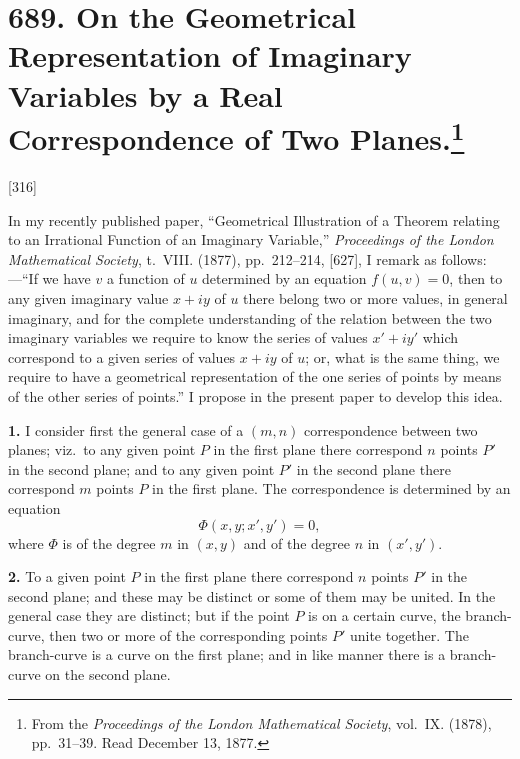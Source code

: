 \documentclass[11pt,a4paper]{book}
\begin{document}
\newpage
\section[On the Geometrical Representation of Imaginary Variables by a Real Correspondence of Two Planes]{689. On the Geometrical Representation of Imaginary Variables by a Real Correspondence of Two Planes.\footnote{From the \textit{Proceedings of the London Mathematical Society}, vol.\ IX. (1878), pp.\ 31--39. Read December 13, 1877.}}

[316]

In my recently published paper, ``Geometrical Illustration of a Theorem relating to an Irrational Function of an Imaginary Variable,'' \textit{Proceedings of the London Mathematical Society}, t.\ VIII. (1877), pp.\ 212--214, [627], I remark as follows:---``If we have $v$ a function of $u$ determined by an equation $f(u, v) = 0$, then to any given imaginary value $x + iy$ of $u$ there belong two or more values, in general imaginary, and for the complete understanding of the relation between the two imaginary variables we require to know the series of values $x' + iy'$ which correspond to a given series of values $x + iy$ of $u$; or, what is the same thing, we require to have a geometrical representation of the one series of points by means of the other series of points.'' I propose in the present paper to develop this idea.

\medskip
\noindent\textbf{1.}\quad
I consider first the general case of a $(m, n)$ correspondence between two planes; viz.\ to any given point $P$ in the first plane there correspond $n$ points $P'$ in the second plane; and to any given point $P'$ in the second plane there correspond $m$ points $P$ in the first plane. The correspondence is determined by an equation
\[
\Phi(x, y; x', y') = 0,
\]
where $\Phi$ is of the degree $m$ in $(x, y)$ and of the degree $n$ in $(x', y')$.

\medskip
\noindent\textbf{2.}\quad
To a given point $P$ in the first plane there correspond $n$ points $P'$ in the second plane; and these may be distinct or some of them may be united. In the general case they are distinct; but if the point $P$ is on a certain curve, the branch-curve, then two or more of the corresponding points $P'$ unite together. The branch-curve is a curve on the first plane; and in like manner there is a branch-curve on the second plane.
\end{document}
